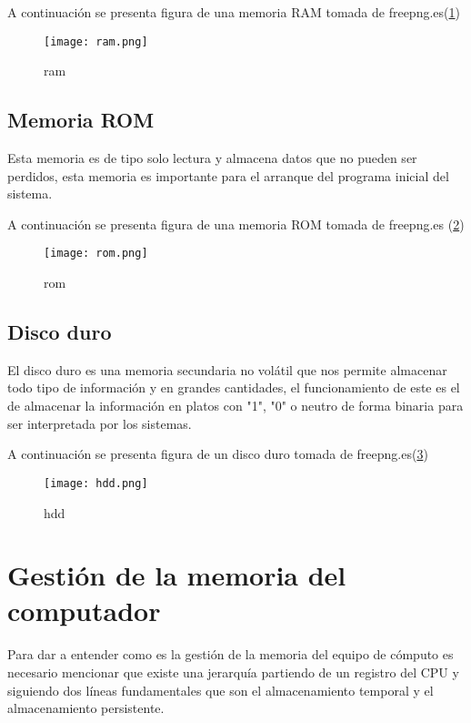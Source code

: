 \documentclass{article}
\begin{document}
	A continuación se presenta figura de una memoria RAM tomada de freepng.es(\ref{fig:ram})
	\begin{figure}[h]
		\texttt{[image: ram.png]}
		\centering
		\caption{ram}
		\label{fig:ram}
	\end{figure}
	
	\subsection{Memoria ROM}
	Esta memoria es de tipo solo lectura y almacena datos que no pueden ser perdidos, esta memoria es importante para el arranque del programa inicial del sistema. \cite{TecnologiaInformatica}
	
	A continuación se presenta figura de una memoria ROM tomada de freepng.es (\ref{fig:rom})
	\begin{figure}[h]
		\texttt{[image: rom.png]}
		\centering
		\caption{rom}
		\label{fig:rom}
	\end{figure}
	\subsection{Disco duro}
	El disco duro es una memoria secundaria no volátil que nos permite almacenar todo tipo de información y en grandes cantidades, el funcionamiento de este es el de almacenar la información en platos con "1", "0" o neutro de forma binaria para ser interpretada por los sistemas.\cite{TecnologiaInformatica}
	
	A continuación se presenta figura de un disco duro tomada de freepng.es(\ref{fig:hdd})
	\begin{figure}[h]
		\texttt{[image: hdd.png]}
		\centering
		\caption{hdd}
		\label{fig:hdd}
	\end{figure}
	
	\section{Gestión de la memoria del computador}
	Para dar a entender como es la gestión de la memoria del equipo de cómputo es necesario mencionar que existe una jerarquía partiendo de un registro del CPU y siguiendo dos líneas fundamentales que son el almacenamiento temporal y el almacenamiento persistente.
\end{document}
